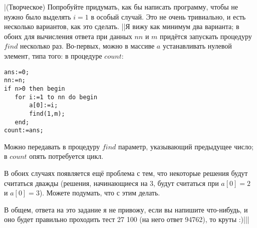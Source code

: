 \task|(Творческое) Попробуйте придумать, как бы написать программу, чтобы 
не нужно было выделять $i=1$ в особый случай. Это не очень тривиально, и есть 
несколько вариантов, как это сделать.
||Я вижу как минимум два варианта; в обоих для вычисления ответа при данных $nn$ и 
$m$ придётся запускать процедуру $find$ несколько раз. Во-первых, можно в массиве $a$ 
устанавливать нулевой элемент, типа того: в процедуре $count$:
\begin{codesampleo}\begin{verbatim}
ans:=0;
nn:=n;
if n>0 then begin
   for i:=1 to nn do begin
       a[0]:=i;
       find(1,m);
   end;
count:=ans;
\end{verbatim}\end{codesampleo}

Можно передавать в процедуру $find$ параметр, указывающий предыдущее число; в 
$count$ опять потребуется цикл.

В обоих случаях появляется ещё проблема с тем, что некоторые решения будут
считаться дважды (решения, начинающиеся на 3, будут считаться при $a[0]=2$ и
$a[0]=3$). Можете подумать, что с этим делать.

В общем, ответа на это задание я не привожу, если вы напишите что-нибудь, и оно 
будет правильно проходить тест 27 100 (на него ответ 94762), то круты :)|||


